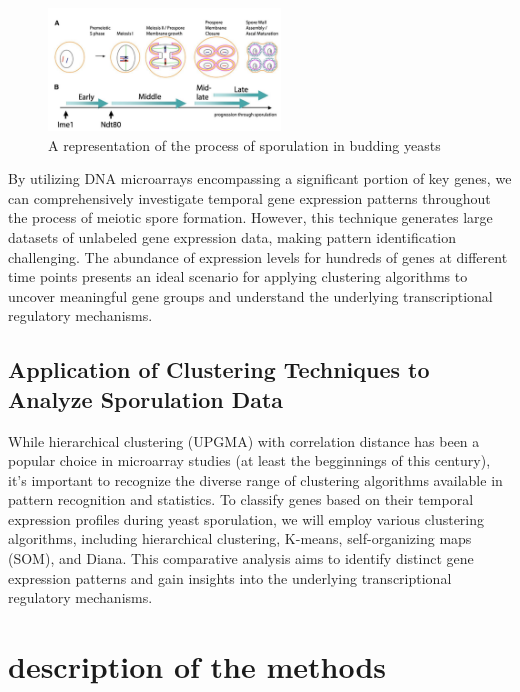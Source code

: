 \documentclass{llncs}
\begin{document}
\begin{figure}[h!]
	\begin{center}  %
		\includegraphics[width=0.55\textwidth]{images/sporlutation.png}
		\caption{A representation of the process of sporulation in budding yeasts}
		\label{fig:Sporlutation}
	\end{center}
\end{figure}


By utilizing DNA microarrays encompassing a significant portion of key genes, we can comprehensively investigate temporal gene expression patterns throughout the process of meiotic spore formation. However, this technique generates large datasets of unlabeled gene expression data, making pattern identification challenging. The abundance of expression levels for hundreds of genes at different time points presents an ideal scenario for applying clustering algorithms to uncover meaningful gene groups and understand the underlying transcriptional regulatory mechanisms.\cite{datta2003}

\subsection*{Application of Clustering Techniques to Analyze Sporulation Data}

While hierarchical clustering (UPGMA) with correlation distance has been a popular choice in microarray studies (at least the begginnings of this century), it's important to recognize the diverse range of clustering algorithms available in pattern recognition and statistics. To classify genes based on their temporal expression profiles during yeast sporulation, we will employ various clustering algorithms, including hierarchical clustering, K-means, self-organizing maps (SOM), and Diana. This comparative analysis aims to identify distinct gene expression patterns and gain insights into the underlying transcriptional regulatory mechanisms.\cite{datta2003}



\section{description of the methods}
\end{document}
